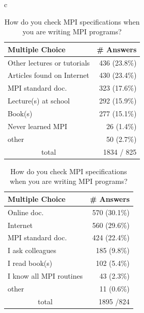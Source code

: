 \documentclass[sigconf,nonacm]{acmart}
\begin{document}
\begin{table}[htb]%
\scriptsize
\begin{center}%
\begin{tabular}{c}

\begin{minipage}{0.24\hsize}
\begin{center}%
\caption{\small How did you learn MPI?}%
\label{tab:Q10-ans}%
\begin{tabular}{l|r}%
\hline%
Multiple Choice & \# Answers \\%
\hline%
Other lectures or tutorials & 436 (23.8\%) \\%
Articles found on Internet & 430 (23.4\%) \\%
MPI standard doc. & 323 (17.6\%) \\%
Lecture(s) at school & 292 (15.9\%) \\%
Book(s) & 277 (15.1\%) \\%
Never learned MPI & 26 (1.4\%) \\%
other & 50 (2.7\%) \\%
\hline%
\multicolumn{1}{c}{total} & 1834 / 825 \\%
\hline%
\end{tabular}%
\end{center}%
\end{minipage}

\hspace{1mm}
\begin{minipage}{0.24\hsize}
\begin{center}%
\caption{\footnotesize How do you check MPI specifications when you are writing MPI programs?}%
\label{tab:Q14-ans}%
\begin{tabular}{l|r}%
\hline%
Multiple Choice & \# Answers \\%
\hline%
Online doc. & 570 (30.1\%) \\%
Internet & 560 (29.6\%) \\%
MPI standard doc. & 424 (22.4\%) \\%
I ask colleagues & 185 (9.8\%) \\%
I read book(s) & 102 (5.4\%) \\%
I know all MPI routines & 43 (2.3\%) \\%
other & 11 (0.6\%) \\%
\hline%
\multicolumn{1}{c}{total} & 1895 /824 \\%
\hline%
\end{tabular}%
\end{center}%
\end{minipage}


\end{tabular}
\end{center}
\end{table}
\end{document}
